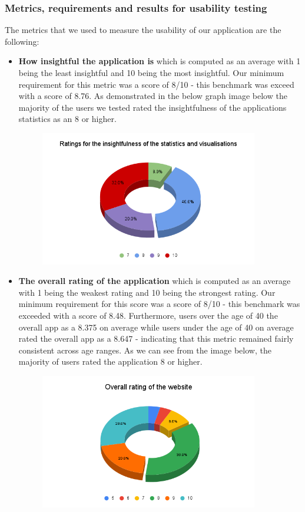 \documentclass[12pt]{article}
\begin{document}
\subsubsection{Metrics, requirements and results for usability testing}
The metrics that we used to measure the usability of our application are the following:

\begin{itemize}
    \item \textbf{How insightful the application is} which is computed as an average with 1 being the least insightful and 10 being the most insightful. Our minimum requirement for this metric was a score of 8/10 - this benchmark was exceed with a score of 8.76. As demonstrated in the below graph image below the majority of the users we tested rated the insightfulness of the applications statistics as an 8 or higher.
        \begin{figure}[H]
            \centering
            \includegraphics[width=0.9\textwidth]{piechart.png}
        \end{figure}
    \item \textbf{The overall rating of the application} which is computed as an average with 1 being the weakest rating and 10 being the strongest rating. Our minimum requirement for this score was a score of 8/10 - this benchmark was exceeded with a score of 8.48. Furthermore, users over the age of 40 the overall app as a 8.375 on average while users under the age of 40 on average rated the overall app as a 8.647 - indicating that this metric remained fairly consistent across age ranges. As we can see from the image below, the majority of users rated the application 8 or higher.
        \begin{figure}[H]
            \centering
            \includegraphics[width=0.9\textwidth]{Overall rating of the website.png}

\end{figure}
\end{itemize}
\end{document}

